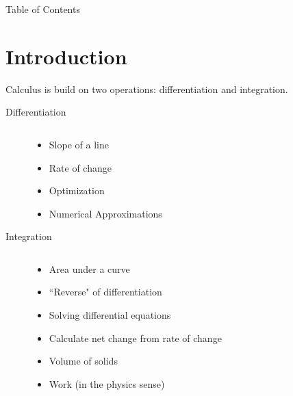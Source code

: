 

 \begin{frame}{Table of Contents }
\mapofcontentsA{\aa,\aintro}
 \end{frame}


\section{Introduction}



  \label{note1.1a}
 \begin{frame}[t]
 
 Calculus is build on two operations: \alert{differentiation} and \alert{integration}.
 \vfill
 \begin{description}
 \item[Differentiation]$ $
 \begin{itemize}
 \item Slope of a line
 \item Rate of change \pause
 \item Optimization
 \item Numerical Approximations
 \end{itemize}
 \pause\vfill
 \item[Integration]$ $
  \begin{itemize}
 \item Area under a curve
 \item ``Reverse" of differentiation
 \pause
 \item Solving differential equations
 \item Calculate net change from rate of change
 \item Volume of solids
 \item Work (in the physics sense)
 \end{itemize}
 \end{description}
\end{frame}

